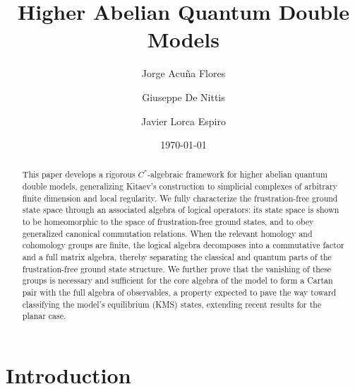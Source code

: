 \documentclass[a4paper,12pt,twoside,reqno]{amsart}
\theoremstyle{plain}
\theoremstyle{definition}
\theoremstyle{remark}
\numberwithin{equation}{section}
\numberwithin{figure}{section}
\numberwithin{table}{section}
\begin{document}
	
	\title[Higher Abelian Quantum Double Models]{Higher Abelian Quantum Double Models}
	
	\author[J. Acu\~na Flores]{Jorge Acu\~{n}a Flores}
	\address{Facultad de Matem\'{a}ticas, Pontificia Universidad Cat\'{o}lica de Chile, Santiago, Chile}
	
	\author[G. De~Nittis]{Giuseppe De Nittis}
	\address{Facultad de Matem\'{a}ticas \& Instituto de F\'{i}sica, Pontificia Universidad Cat\'{o}lica de Chile, Santiago, Chile}
	
	\author[J. Lorca Espiro]{Javier Lorca Espiro}
	\address{Departamento de Ciencias F\'{i}sicas, Facultad de Ingenier\'{i}a y Ciencias, Universidad de La Frontera, Avda. Francisco Salazar 01145, Casilla 54-D Temuco, Chile}
	
	\date{\today}
	
	\begin{abstract}
		This paper develops a rigorous $C^*$-algebraic framework for higher abelian quantum double models, generalizing Kitaev's construction to simplicial complexes of arbitrary finite dimension and local regularity. We fully characterize the frustration-free ground state space through an associated algebra of logical operators: its state space is shown to be homeomorphic to the space of frustration-free ground states, and to obey generalized canonical commutation relations. When the relevant homology and cohomology groups are finite, the logical algebra decomposes into a commutative factor and a full matrix algebra, thereby separating the classical and quantum parts of the frustration-free ground state structure. We further prove that the vanishing of these groups is necessary and sufficient for the core algebra of the model to form a Cartan pair with the full algebra of observables, a property expected to pave the way toward classifying the model's equilibrium (KMS) states, extending recent results for the planar case.
	\end{abstract}
	
	\maketitle
	\tableofcontents
	
	
	\section{Introduction}
	
\end{document}
